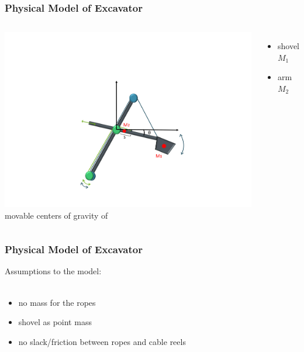 \begin{frame}
	\frametitle{Physical Model of Excavator}
	
	
	\begin{columns}
			\centering
			\includegraphics[trim=30cm 5cm 30cm 23cm, clip=true, width=\linewidth]{img/Excavator_mass2}
			movable centers of gravity of
			\begin{itemize}
				\item{shovel $M_1$}
				\item{arm $M_2$}
			\end{itemize}
	\end{columns}
	
\end{frame}

\begin{frame}
	\frametitle{Physical Model of Excavator}
	
	
	Assumptions to the model:\\
	$ $ \\
	\begin{itemize}
		\item no mass for the ropes
		\item shovel as point mass %
		\item no slack/friction between ropes and cable reels
	\end{itemize}
	
\end{frame}

